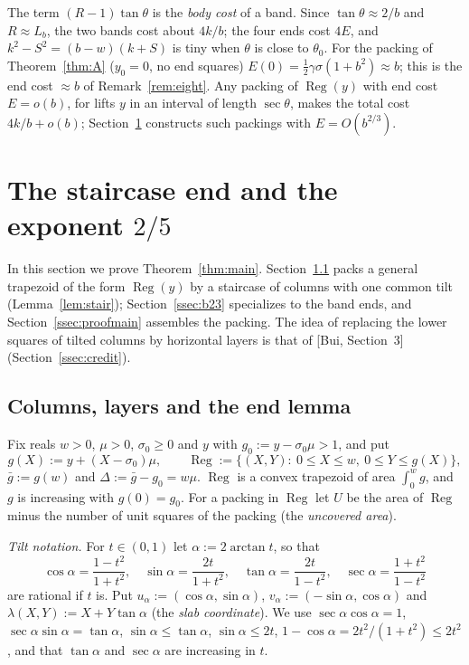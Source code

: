 \documentclass[11pt]{amsart}
\newcommand{\Reg}{\operatorname{Reg}}
\newcommand{\ca}{\cos\alpha}
\newcommand{\sa}{\sin\alpha}
\newcommand{\ta}{\tan\alpha}
\newcommand{\se}{\sec\alpha}
\theoremstyle{definition}
\theoremstyle{remark}
\numberwithin{equation}{section}
\begin{document}
The term $(R-1)\tan\theta$ is the \emph{body cost} of a band. Since $\tan\theta\approx2/b$ and $R\approx L_b$, the two
bands cost about $4k/b$; the four ends cost $4E$, and $k^2-S^2=(b-w)(k+S)$ is tiny when $\theta$ is close to $\theta_0$.
For the packing of Theorem~\ref{thm:A} ($y_0=0$, no end squares) $E(0)=\frac12\gamma\sigma(1+b^2)\approx b$; this is the
end cost $\approx b$ of Remark~\ref{rem:eight}. Any packing of $\Reg(y)$ with end cost $E=o(b)$, for lifts
$y$ in an interval of length $\sec\theta$, makes the total cost $4k/b+o(b)$; Section~\ref{sec:stair} constructs such
packings with $E=O(b^{2/3})$.

\section{The staircase end and the exponent \texorpdfstring{$2/5$}{2/5}}\label{sec:stair}

In this section we prove Theorem~\ref{thm:main}. Section~\ref{ssec:stairlemma} packs a general trapezoid of the form
$\Reg(y)$ by a staircase of columns with one common tilt (Lemma~\ref{lem:stair}); Section~\ref{ssec:b23} specializes
to the band ends, and Section~\ref{ssec:proofmain} assembles the packing. The idea of replacing the lower squares of
tilted columns by horizontal layers is that of [Bui, Section~3] (Section~\ref{ssec:credit}).

\subsection{Columns, layers and the end lemma}\label{ssec:stairlemma}
Fix reals $w>0$, $\mu>0$, $\sigma_0\ge0$ and $y$ with $g_0:=y-\sigma_0\mu>1$, and put
\[
g(X):=y+(X-\sigma_0)\mu,\qquad \Reg:=\{(X,Y):\ 0\le X\le w,\ 0\le Y\le g(X)\},
\]
$\bar g:=g(w)$ and $\Delta:=\bar g-g_0=w\mu$.
$\Reg$ is a convex trapezoid of area $\int_0^wg$, and $g$ is increasing with $g(0)=g_0$. For a packing in $\Reg$ let
$U$ be the area of $\Reg$ minus the number of unit squares of the packing (the \emph{uncovered area}).

\emph{Tilt notation.} For $t\in(0,1)$ let $\alpha:=2\arctan t$, so that
\[
\ca=\frac{1-t^2}{1+t^2},\quad \sa=\frac{2t}{1+t^2},\quad \ta=\frac{2t}{1-t^2},\quad \se=\frac{1+t^2}{1-t^2}
\]
are rational if $t$ is. Put $u_\alpha:=(\ca,\sa)$, $v_\alpha:=(-\sa,\ca)$ and $\lambda(X,Y):=X+Y\ta$ (the \emph{slab
coordinate}). We use $\se\ca=1$, $\se\sa=\ta$, $\sa\le\ta$, $\sa\le2t$, $1-\ca=2t^2/(1+t^2)\le2t^2$, and that
$\ta$ and $\se$ are increasing in $t$.
\end{document}
